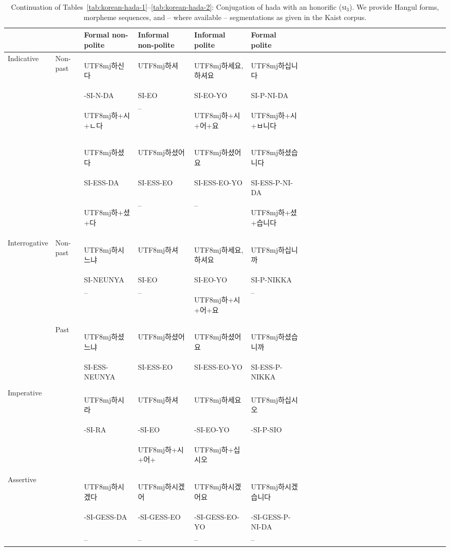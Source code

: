 \documentclass[11pt,letterpaper]{article}
\newcommand{\korean}[1]{\begin{CJK}{UTF8}{mj}#1\end{CJK}}
\begin{document}
\begin{table}[]
    \centering
    \begin{tabular}{llllllllllllllllllllllllll}
           &          &Formal non-polite & Informal non-polite & Informal polite & Formal polite \\ \hline \hline
\multirow{2}{*}{Indicative} & Non-past & \korean{하신다} & \korean{하셔} & \korean{하세요, 하셔요} & \korean{하십니다} \\
                           && -SI-N-DA & SI-EO & SI-EO-YO & SI-P-NI-DA \\
&& \korean{하+시+ㄴ다}       &   --   &    \korean{하+시+어+요}             &  \korean{하+시+ㅂ니다}        \\
\hline
&& \korean{하셨다} & \korean{하셨어} & \korean{하셨어요} & \korean{하셨습니다} \\
&& SI-ESS-DA & SI-ESS-EO & SI-ESS-EO-YO & SI-ESS-P-NI-DA \\
& & \korean{하+셨+다}       &  --    &        --        &  \korean{하+셨+습니다}       \\
\hline
\multirow{2}{*}{Interrogative} & Non-past & \korean{하시느냐} & \korean{하셔} & \korean{하세요, 하셔요} & \korean{하십니까} \\
&& SI-NEUNYA & SI-EO & SI-EO-YO & SI-P-NIKKA \\
& &   --     &   --   &   \korean{하+시+어+요}             &  --        \\
\hline
& Past & \korean{하셨느냐} & \korean{하셨어} & \korean{하셨어요} & \korean{하셨습니까} \\
&      & SI-ESS-NEUNYA & SI-ESS-EO          & SI-ESS-EO-YO & SI-ESS-P-NIKKA \\
& &        &      &                &          \\
\hline
\multirow{2}{*}{Imperative} && \korean{하시라} & \korean{하셔} & \korean{하세요} & \korean{하십시오} \\
&& -SI-RA & -SI-EO & -SI-EO-YO & -SI-P-SIO \\
&        &      & \korean{하+시+어+}               &   \korean{하+십시오}       \\
\hline
\multirow{2}{*}{Assertive} & & \korean{하시겠다} & \korean{하시겠어} & \korean{하시겠어요} & \korean{하시겠습니다} \\
&        &  -SI-GESS-DA     &  -SI-GESS-EO              &  -SI-GESS-EO-YO & -SI-GESS-P-NI-DA        \\
&& -- & -- & -- & -- \\
    \end{tabular}
    \caption{Continuation of Tables~\ref{tab:korean-hada-1}--\ref{tab:korean-hada-2}: Conjugation of hada with an honorific (\textsc{si}$_3$). We provide Hangul forms, morpheme sequences, and -- where available -- segmentations as given in the Kaist corpus.}
    \label{tab:korean-hada-3}
\end{table}
\end{document}
